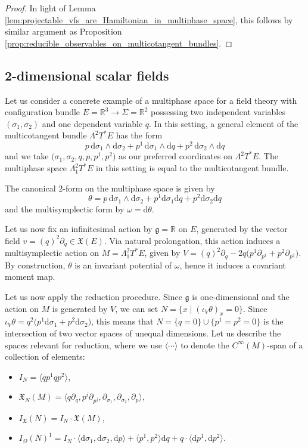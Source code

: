 \documentclass[pdftex]{sigma}
\numberwithin{equation}{section}
\newcommand{\g}{\mathfrak{g}}
\newcommand{\tgtvanform}{I_{\Omega}(N)}
\newcommand{\tgtvf}{\mathfrak X_N(M)}
\newcommand{\vanvf}{I_{\mathfrak{X}}(N)}%
\renewcommand{\d}{\mathrm{d}}
\begin{document}
\begin{proof}
	In light of Lemma \ref{lem:projectable_vfs_are_Hamiltonian_in_multiphase_space}, this follows by similar argument as Proposition \ref{prop:reducible_observables_on_multicotangent_bundles}.
\end{proof}

\subsection{2-dimensional scalar fields}\label{Ssec:2dim-ScalarField}

Let us consider a concrete example of a multiphase space for a field theory with configuration bundle $E=\mathbb R^3\to \Sigma=\mathbb R^2$ possessing two independent variables $(\sigma_1,\sigma_2)$ and one dependent variable $q$. In this setting, a general element of the multicotangent bundle $\Lambda^2T^*E$ has the form
\[
	p\,\d\sigma_1\wedge \d\sigma_2+p^1\,\d\sigma_1\wedge\d q+p^2\,\d\sigma_2\wedge\d q
\]
and we take $\bigl(\sigma_1,\sigma_2,q, p, p^1,p^2\bigr)$ as our preferred coordinates on $\Lambda^2T^*E$. The multiphase space $\Lambda_1^2T^*E$ in this setting is equal to the multicotangent bundle.

The canonical $2$-form on the multiphase space is given by
\[
	\theta=p\,\d\sigma_1\wedge \d\sigma_2+p^1\d\sigma_1\d q+p^2\d\sigma_2\d q
\]
and the multisymplectic form by $\omega=\d\theta$.

Let us now fix an infinitesimal action by $\mathfrak g=\mathbb R$ on $E$, generated by the vector field $v=(q)^2\partial_{q}\in\mathfrak X(E)$. Via natural prolongation, this action induces a multisymplectic action on $M=\Lambda_1^2T^*E$, given by  $V=(q)^2\partial_{q}-2q\bigl(p^1\partial_{p^1}+p^2\partial_{p^2}\bigr)$. By construction, $\theta$ is an invariant potential of $\omega$, hence it induces a covariant moment map.

Let us now apply the reduction procedure. Since $\g$ is one-dimensional and the action on $M$ is generated by $V$, we can set $N=\{x\mid (\iota_V\theta)_x=0\}$. Since $\iota_V\theta=q^2\bigl(p^1\d\sigma_1+ p^2\d\sigma_2\bigr)$, this means that $N=\{q=0\}\cup \bigl\{p^1=p^2=0\bigr\}$ is the intersection of two vector spaces of unequal dimensions. Let us describe the spaces relevant for reduction, where we use $\langle\cdots\rangle$ to denote the $C^\infty(M)$-span of a collection of elements:
\begin{itemize}\itemsep=0pt
	\item $I_N=\bigl\langle qp^1 qp^2\bigr\rangle$,
	\item $\tgtvf=\bigl\langle q\partial_{q}, p^i\partial_{p^j}, \partial_{\sigma_1}, \partial_{\sigma_2},  \partial_p  \bigr\rangle$,
	\item $\vanvf=I_N\cdot\mathfrak X(M)$,
	\item $\tgtvanform^1=I_N\cdot \langle \d{\sigma_1}, \d{\sigma_2}, \d p \rangle + \bigl\langle p^1,p^2\bigr\rangle \d q+ q\cdot \bigl\langle \d p^1,\d p^2\bigr\rangle$.
\end{itemize}
\end{document}
